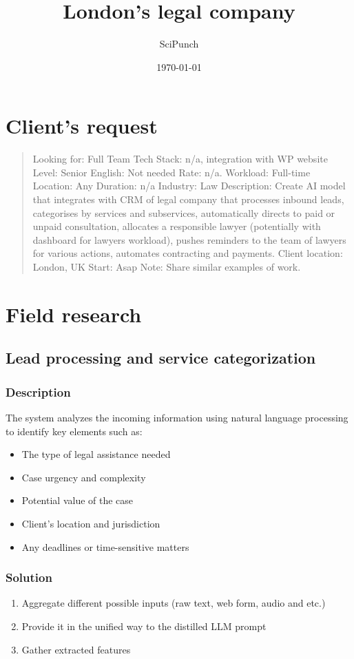 \documentclass[11pt]{article}
\author{SciPunch}
\date{\today}
\title{London's legal company}
\begin{document}
\maketitle
\tableofcontents

\section{Client's request}
\label{sec:org42e89bd}
\begin{quote}
Looking for: Full Team
Tech Stack: n/a, integration with WP website
Level: Senior
English: Not needed
Rate: n/a.
Workload: Full-time
Location: Any
Duration: n/a
Industry: Law
Description: Create AI model that integrates with CRM of legal company that processes inbound leads, categorises by services and subservices, automatically directs to paid or unpaid consultation, allocates a responsible lawyer (potentially with dashboard for lawyers workload), pushes reminders to the team of lawyers for various actions, automates contracting and payments.
Client location: London, UK
Start: Asap
Note: Share similar examples of work.
\end{quote}
\section{Field research}
\label{sec:org7ccbd2a}
\subsection{Lead processing and service categorization}
\label{sec:org8f1ab83}

\subsubsection{Description}
\label{sec:org8e580b5}

The system analyzes the incoming information using natural language processing to identify key elements such as:
\begin{itemize}
\item The type of legal assistance needed
\item Case urgency and complexity
\item Potential value of the case
\item Client's location and jurisdiction
\item Any deadlines or time-sensitive matters
\end{itemize}
\subsubsection{Solution}
\label{sec:orgf068026}
\begin{enumerate}
\item Aggregate different possible inputs (raw text, web form, audio and etc.)
\item Provide it in the unified way to the distilled LLM prompt
\item Gather extracted features
\end{enumerate}
\end{document}
